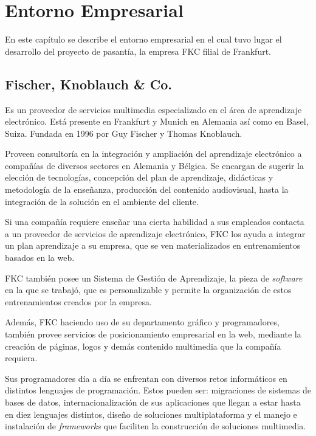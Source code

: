 \chapter{Entorno Empresarial}
\thispagestyle{empty} %

En este capítulo se describe el entorno empresarial en el cual tuvo lugar el desarrollo del proyecto de pasantía, la empresa \gls{FKC} filial de Frankfurt.

\section{Fischer, Knoblauch \& Co.}

Es un proveedor de servicios multimedia especializado en el área de aprendizaje electrónico. Está presente en Frankfurt y Munich en Alemania así como en Basel, Suiza. Fundada en 1996 por Guy Fischer y Thomas Knoblauch.

Proveen consultoría en la integración y ampliación del aprendizaje electrónico a compañías de diversos sectores en Alemania y Bélgica. Se encargan de sugerir la elección de tecnologías, concepción del plan de aprendizaje, didácticas y metodología de la enseñanza, producción del contenido audiovisual, hasta la integración de la solución en el ambiente del cliente. 

Si una compañía requiere enseñar una cierta habilidad a sus empleados contacta a un proveedor de servicios de aprendizaje electrónico, \gls{FKC} los ayuda a integrar un plan aprendizaje a su empresa, que se ven materializados en entrenamientos basados en la web. 

\gls{FKC} también posee un Sistema de Gestión de Aprendizaje, la pieza de \emph{software} en la que se trabajó, que es personalizable y permite la organización de estos entrenamientos creados por la empresa.

Además, \gls{FKC} haciendo uso de su departamento gráfico y programadores, también provee servicios de posicionamiento empresarial en la web, mediante la creación de páginas, logos y demás contenido multimedia que la compañía requiera. 

Sus programadores día a día se enfrentan con diversos retos informáticos en distintos lenguajes de programación. Estos pueden ser: migraciones de sistemas de bases de datos, internacionalización de sus aplicaciones que llegan a estar hasta en diez lenguajes distintos, diseño de soluciones multiplataforma y el manejo e instalación de \emph{frameworks} que faciliten la construcción de soluciones multimedia.


